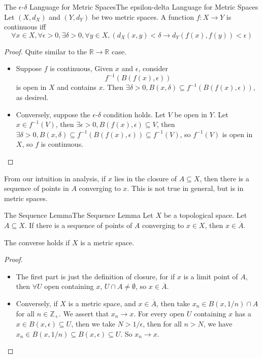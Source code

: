 \documentclass[../main.tex]{subfiles}
\begin{document}
\begin{theorem}{The $\epsilon$-$\delta$ Language for Metric Spaces}{The epsilon-delta Language for Metric Spaces}
Let $(X,d_X)$ and $(Y,d_Y)$ be two metric spaces. A function $f: X \rightarrow Y$ is continuous iff 
\begin{equation}
\forall x\in X,\forall \epsilon>0, \exists \delta>0, \forall y\in X, (d_X(x,y)<\delta \rightarrow d_Y(f(x),f(y))<\epsilon)
\end{equation}
\end{theorem}
\begin{proof}
Quite similar to the $\mathbb{R} \rightarrow \mathbb{R}$ case.
\begin{itemize}
\item Suppose $f$ is continuous, Given $x$ and $\epsilon$, consider
	\begin{equation*}
		f^{-1}(B(f(x),\epsilon))
	\end{equation*}
	is open in $X$ and contains $x$. Then $\exists \delta>0,B(x,\delta) \subseteq f^{-1}(B(f(x),\epsilon))$, as desired.

\item Conversely, suppose the $\epsilon$-$\delta$ condition holds. Let $V$ be open in $Y$. Let $x\in f^{-1}(V)$, then $\exists \epsilon>0, B(f(x),\epsilon) \subseteq V$, then $\exists \delta>0, B(x,\delta) \subseteq f^{-1}(B(f(x),\epsilon)) \subseteq f^{-1}(V)$, so $f^{-1}(V)$ is open in $X$, so $f$ is continuous.
\end{itemize}
\end{proof}

From our intuition in analysis, if $x$ lies in the closure of $A \subseteq X$, then there is a sequence of points in $A$ converging to $x$. This is not true in general, but is in metric spaces.

\begin{lemma}{The Sequence Lemma}{The Sequence Lemma}
Let $X$ be a topological space. Let $A \subseteq X$. If there is a sequence of points of $A$ converging to $x\in X$, then $x\in \overline{A}$.

The converse holds if $X$ is a metric space.
\end{lemma}
\begin{proof}
\begin{itemize}
\item The first part is just the definition of closure, for if $x$ is a limit point of $A$, then $\forall U$ open containing $x$, $U\cap A \neq \emptyset$, so $x\in \overline{A}$.
\item Conversely, if $X$ is a metric space, and $x\in \overline{A}$, then take $x_n\in B(x,1 / n)\cap A$ for all $n\in \mathbb{Z}_+$. We assert that $x_n \rightarrow x$. For every open $U$ containing $x$ has a $x\in B(x,\epsilon) \subseteq U$, then we take $N > 1 / \epsilon$, then for all $n>N$, we have $x_n \in B(x,1/n) \subseteq B(x,\epsilon) \subseteq U$. So $x_n \rightarrow x$.
\end{itemize}
\end{proof}
\end{document}
